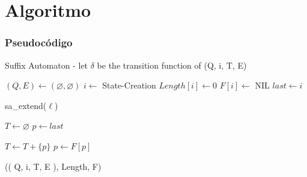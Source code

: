 \section{Algoritmo}\label{Algorithm}

\subsubsection{Pseudocódigo}


\begin{alg}
	Suffix Automaton - let $\delta$ be the transition function of (Q, i, T, E)
	\begin{algorithmic}[1]
		
			\State $(Q, E) \leftarrow (\varnothing, \varnothing)$
			\State $i \leftarrow$ State-Creation
			\State $Length[i] \leftarrow 0$
			\State $F[i] \leftarrow$ NIL
			\State $last \leftarrow i$
			
				\State  sa\_extend($\ell$)
			\EndFor
			
			\State $T \leftarrow \varnothing$
			\State $p \leftarrow last$
			
				\State $T \leftarrow T + \{p\}$
				\State $p \leftarrow F[p]$
			\EndWhile
			
			\Return (( Q, i, T, E ), Length, F)		
		\EndFunction
		
	\end{algorithmic}
\end{alg}


